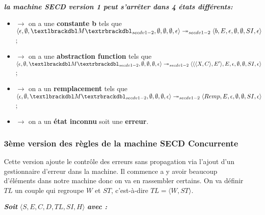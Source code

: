 \documentclass[10pt,a4paper]{report}
\begin{document}
\textbf{\textit{la machine SECD version 1 peut s'arrêter dans 4 états différents:}}
\smallbreak
\begin{itemize}
\item[]$\longrightarrow$ on a une \textbf{constante b} tels que $\langle \epsilon,\emptyset,\textlbrackdbl M\textrbrackdbl_{secdv1-2},\emptyset,\emptyset,\emptyset,\epsilon\rangle \twoheadrightarrow_{secdv1-2} \langle b,E,\epsilon,\emptyset,\emptyset,SI,\epsilon\rangle$;
\item[]$\longrightarrow$ on a une \textbf{abstraction function} tels que $\langle \epsilon,\emptyset,\textlbrackdbl M\textrbrackdbl_{secdv1-2},\emptyset,\emptyset,\emptyset,\epsilon\rangle \twoheadrightarrow_{secdv1-2} \langle\langle\langle X,C\rangle,E'\rangle,E,\epsilon,\emptyset,\emptyset,SI,\epsilon\rangle$;
\item[]$\longrightarrow$ on a un \textbf{remplacement} tels que $\langle \epsilon,\emptyset,\textlbrackdbl M\textrbrackdbl_{secdv1-2},\emptyset,\emptyset,\emptyset,\epsilon\rangle \twoheadrightarrow_{secdv1-2} \langle Remp,E,\epsilon,\emptyset,\emptyset,SI,\epsilon\rangle$;
\item[]$\longrightarrow$ on a un \textbf{état inconnu} soit une \textbf{erreur}.
\end{itemize}
\newpage


\subsubsection{3ème version des règles de la machine SECD Concurrente}\label{SECDConc3}
\smallbreak
Cette version ajoute le contrôle des erreurs sans propagation via l'ajout d'un gestionnaire d'erreur dans la machine. Il commence a y avoir beaucoup d'éléments dans notre machine donc on va en rassembler certains. On va définir $TL$ un couple qui regroupe $W$ et $ST$, c'est-à-dire $TL = \langle W,ST\rangle$.
\bigbreak

\textbf{\textit{Soit}} $\langle S,E,C,D,TL,SI,H\rangle$ \textbf{\textit{avec :}}
\end{document}
